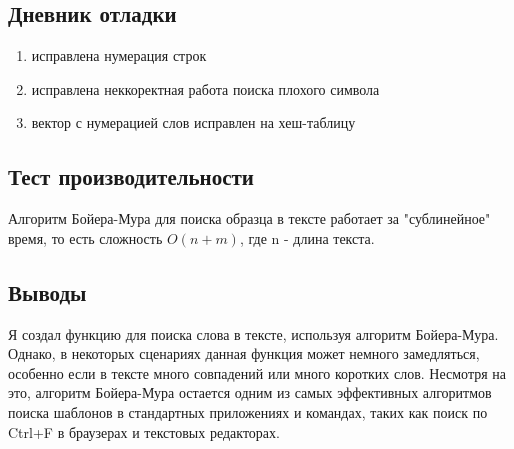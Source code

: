\documentclass[12pt]{article}
\begin{document}
\newpage
\subsection*{Дневник отладки}

\begin{enumerate}
    \item исправлена нумерация строк
    \item исправлена неккоректная работа поиска плохого символа
    \item вектор с нумерацией слов исправлен на хеш-таблицу
\end{enumerate}

\newpage
\subsection*{Тест производительности}

Алгоритм Бойера-Мура для поиска образца в тексте работает за "сублинейное" время, то есть сложность $O(n+m)$, где n - длина текста.



\newpage
\subsection*{Выводы}


Я создал функцию для поиска слова в тексте, используя алгоритм Бойера-Мура. 
Однако, в некоторых сценариях данная функция может немного замедляться,
 особенно если в тексте много совпадений или много коротких слов. Несмотря на это, алгоритм Бойера-Мура остается одним из самых эффективных
 алгоритмов поиска шаблонов в стандартных приложениях и командах, таких как поиск по Ctrl+F в браузерах и текстовых редакторах.
\end{document}
